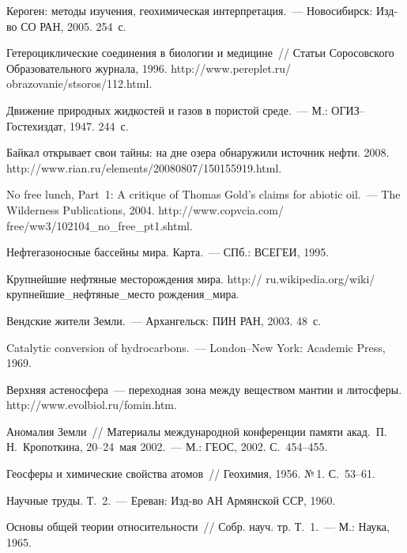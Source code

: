 \begin{multicols}{2}
{{\begin{thebibliography}{99}
Кероген: методы изучения, геохимическая интерпретация.~--- Новосибирск: Изд-во 
СО РАН, 2005.  254~с.

Гетероциклические соединения в биологии и медицине~// Статьи Соросовского 
Образовательного журнала, 1996. {\sf  
http://www.pereplet.ru/ obrazovanie/stsoros/112.html}.

Движение природных жидкостей и газов в пористой среде.~--- М.: 
ОГИЗ--Гостехиздат, 1947.  244~с.

Байкал открывает свои тайны: на дне озера обнару\-жили источник нефти. 2008. {\sf  
http://www.rian.ru/\linebreak elements/20080807/150155919.html}.

No free lunch, Part~1: A critique of Thomas Gold's claims for abiotic oil.~--- The Wilderness Publications, 2004.
 {\sf   http://www.copvcia.com/ free/ww3/102104\_no\_free\_pt1.shtml}.

Нефтегазоносные бассейны мира. Карта.~--- СПб.: ВСЕГЕИ, 1995. 

Крупнейшие нефтяные месторождения мира. {\sf  http:// ru.wikipedia.org/wiki/крупнейшие\_нефтяные\_место рождения\_мира}.

Вендские жители Земли.~--- Архангельск: ПИН РАН, 2003.  48~с.

Catalytic conversion of hydrocarbons.~--- London--New York: Academic Press, 1969.

Верхняя астеносфера~--- переходная зона между веществом мантии и литосферы. {\sf 
http://www.evolbiol.ru/fomin.htm}.

Аномалия Земли~// Материалы международной конференции памяти акад.\ 
П.\,Н.~Кропоткина, 20--24~мая 2002.~--- М.: ГЕОС, 2002. С.~454--455.

Геосферы и химические свойства атомов~// Геохимия, 1956. №\,1.  С.~53--61.

Научные труды. Т.~2.~--- Ереван: Изд-во АН Армянской ССР, 1960.

Основы общей теории относитель\-ности~// Собр. науч. тр. Т.~1.~--- М.: 
Наука, 1965.


\end{thebibliography}}}
\end{multicols}
